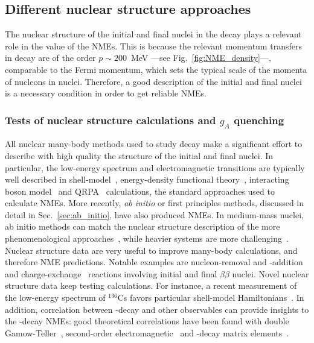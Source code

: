 \subsection{Different nuclear structure approaches}
\label{subsec:manybody}

The nuclear structure of the initial and final nuclei in the \bbonu decay plays a relevant role in the value of the NMEs. This is because the relevant momentum transfers in \bbonu decay are of the order $p\sim200$~MeV  ---see Fig.~\ref{fig:NME_density}---, comparable to the Fermi momentum, which sets the typical scale of the momenta of nucleons in nuclei. Therefore, a good description of the initial and final nuclei is a necessary condition in order to get reliable NMEs.

\subsubsection{Tests of nuclear structure calculations and \texorpdfstring{$g_A$}{gA} quenching}

All nuclear many-body methods used to study \bbonu decay make a significant effort to describe with high quality the structure of the initial and final nuclei. In particular, the low-energy spectrum and electromagnetic transitions are typically well described in shell-model~\cite{Menendez:2009xa,Horoi:2015tkc,Iwata:2016cxn,Coraggio:2020hwx,Coraggio:2022vgy,Tsunoda:2023fqw}, energy-density functional theory~\cite{Yao:2021wst}, interacting boson model~\cite{Kotila:2016pib} and QRPA~\cite{Gimeno:2023dxx} calculations, the standard approaches used to calculate NMEs. More recently, {\it ab initio} or first principles methods, discussed in detail in Sec.~\ref{sec:ab_initio}, have also produced NMEs. In medium-mass nuclei, ab initio methods can match the nuclear structure description of the more phenomenological approaches~\cite{Yao:2020olm,Novario:2020dmr,Belley:2020ejd}, while heavier systems are more challenging~\cite{Belley:2020ejd}.
%
Nuclear structure data are very useful to improve many-body calculations, and therefore NME predictions. Notable examples are nucleon-removal and -addition~\cite{Freeman:2012hr,Freeman:2017bak,Szwec:2016fxr} and charge-exchange~\cite{Frekers:2018edj} reactions involving initial and final $\beta\beta$ nuclei. Novel nuclear structure data keep testing calculations. For instance, a recent measurement of the low-energy spectrum of $^{136}$Cs favors particular shell-model Hamiltonians~\cite{Rebeiro:2023kvs}. In addition, correlation between \bbonu-decay and other observables can provide insights to the \bbonu-decay NMEs: good theoretical correlations have been found with double Gamow-Teller~\cite{Shimizu:2017qcy,Yao:2022usd,Jokiniemi:2023bes}, second-order electromagnetic~\cite{Romeo:2021zrn,Jokiniemi:2023bes} and \bbtnu-decay matrix elements~\cite{Jokiniemi:2022ayc}.

